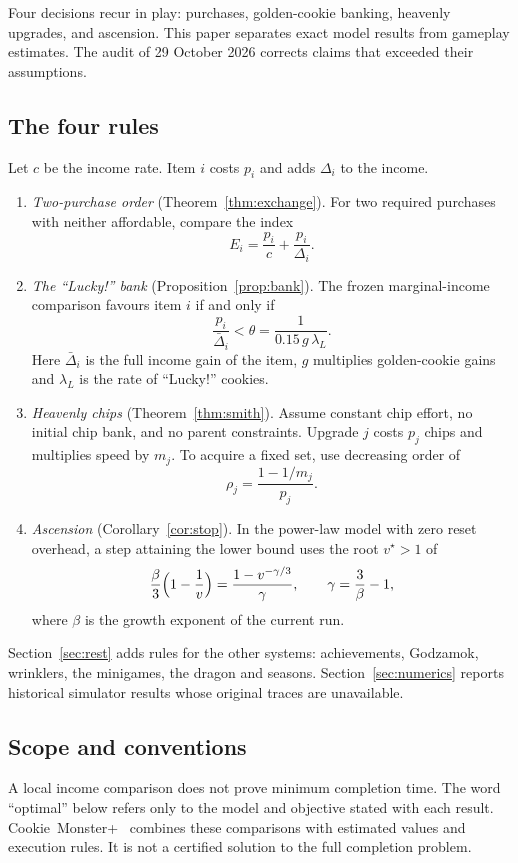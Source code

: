 \documentclass[11pt,a4paper]{article}
\numberwithin{equation}{section}
\theoremstyle{definition}
\theoremstyle{remark}
\newcommand{\Lucky}{\textup{``Lucky!''}}
\begin{document}
Four decisions recur in play: purchases, golden-cookie banking, heavenly upgrades, and ascension. This paper separates exact model results from gameplay estimates. The audit of 29 October 2026 corrects claims that exceeded their assumptions.

\subsection{The four rules}\label{sec:rules}
Let $c$ be the income rate. Item $i$ costs $p_i$ and adds $\Delta_i$ to the income.

\begin{enumerate}
\item \emph{Two-purchase order} (Theorem~\ref{thm:exchange}). For two required purchases with neither affordable, compare the index
\[
 E_i=\frac{p_i}{c}+\frac{p_i}{\Delta_i}.
\]
\item \emph{The \Lucky{} bank} (Proposition~\ref{prop:bank}). The frozen marginal-income comparison favours item $i$ if and only if
\[
 \frac{p_i}{\bar\Delta_i}<\theta=\frac1{0.15\,g\,\lambda_L}.
\]
Here $\bar\Delta_i$ is the full income gain of the item, $g$ multiplies golden-cookie gains and $\lambda_L$ is the rate of \Lucky{} cookies.
\item \emph{Heavenly chips} (Theorem~\ref{thm:smith}). Assume constant chip effort, no initial chip bank, and no parent constraints. Upgrade $j$ costs $p_j$ chips and multiplies speed by $m_j$. To acquire a fixed set, use decreasing order of
\[
 \rho_j=\frac{1-1/m_j}{p_j}.
\]
\item \emph{Ascension} (Corollary~\ref{cor:stop}). In the power-law model with zero reset overhead, a step attaining the lower bound uses the root $v^\star>1$ of
\[
 \frac\beta3\Bigl(1-\frac1v\Bigr)=\frac{1-v^{-\gamma/3}}\gamma,\qquad\gamma=\frac3\beta-1,
\]
where $\beta$ is the growth exponent of the current run.
\end{enumerate}

Section~\ref{sec:rest} adds rules for the other systems: achievements, Godzamok, wrinklers, the minigames, the dragon and seasons. Section~\ref{sec:numerics} reports historical simulator results whose original traces are unavailable.

\subsection{Scope and conventions}\label{sec:conventions}
A local income comparison does not prove minimum completion time. The word ``optimal'' below refers only to the model and objective stated with each result. Cookie~Monster+~\cite{cmplus} combines these comparisons with estimated values and execution rules. It is not a certified solution to the full completion problem.
\end{document}
